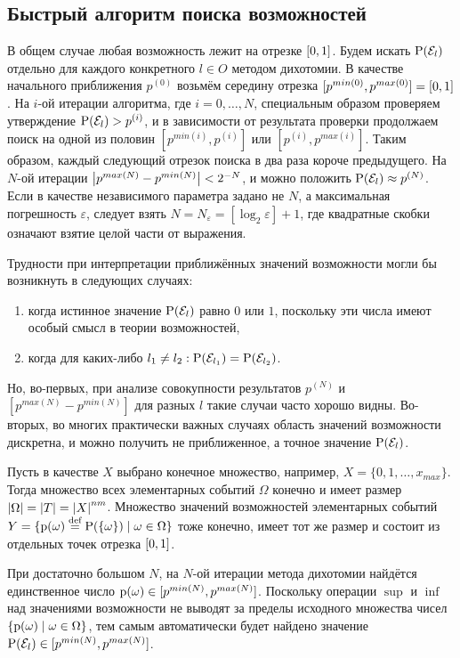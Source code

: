 \subsection{Быстрый алгоритм поиска возможностей}

В общем случае любая возможность лежит на отрезке $[0,1]$. Будем искать ${\mathrm{P}}(\mathcal{E}_l)$ отдельно для каждого конкретного $l \in O$ методом дихотомии. В качестве начального приближения $p^{(0)}$ возьмём середину отрезка $[p^{min(0)}, p^{max(0)}] = [0,1]$. На $i$-ой итерации алгоритма, где $i = 0, \ldots, N$, специальным образом проверяем утверждение ${\mathrm{P}}(\mathcal{E}_l) > p^{(i)}$, и в зависимости от результата проверки продолжаем поиск на одной из половин $[p^{min(i)}, p^{(i)}]$ или $[p^{(i)}, p^{max(i)}]$. Таким образом, каждый следующий отрезок поиска в два раза короче предыдущего.  На $N$-ой итерации $\left| p^{max(N)} - p^{min(N)} \right| < 2^{-N}$, и можно положить ${\mathrm{P}}(\mathcal{E}_l) \approx p^{(N)}$. Если в качестве независимого параметра задано не $N$, а максимальная погрешность  $\varepsilon$, следует взять $N = N_{\varepsilon} = [\log_2{\varepsilon}]+1$,  где квадратные скобки означают взятие целой части от выражения. 

Трудности при интерпретации приближённых значений возможности могли бы возникнуть в следующих случаях:
\begin{enumerate}
  \item когда истинное значение ${\mathrm{P}}(\mathcal{E}_l)$ равно $0$ или $1$, поскольку эти числа имеют особый смысл в теории возможностей,
  \item когда для каких-либо $l_1 \neq l_2: {\mathrm{P}}(\mathcal{E}_{l_1}) = {\mathrm{P}}(\mathcal{E}_{l_2})$.
\end{enumerate}

Но, во-первых, при анализе совокупности результатов $p^{(N)}$ и $[p^{max(N)} - p^{min(N)}]$ для разных $l$ такие случаи часто хорошо видны. Во-вторых, во многих практически важных случаях область значений возможности дискретна, и можно получить не приближенное, а точное значение ${\mathrm{P}}(\mathcal{E}_l)$. 

Пусть в качестве $X$ выбрано конечное множество, например, $X = \{0, 1, \ldots, x_{max}\}$. Тогда множество всех элементарных событий $\Omega$ конечно и имеет размер $\left| \Omega \right|= \left| T \right| = \left| X \right|^{nm}$. Множество значений возможностей элементарных событий $Y = \{{\mathrm{p}}(\omega) \overset{\text{def}}{=} {\mathrm{P}}(\{\omega\})\mid\omega\in\Omega\}$ тоже конечно, имеет тот же размер и состоит из отдельных точек отрезка $[0,1]$. 

При достаточно большом $N$, на $N$-ой итерации метода дихотомии найдётся единственное число ${\mathrm{p}}(\omega)\in[p^{min(N)}, p^{max(N)}]$. Поскольку операции $\sup$ и $\inf$ над значениями возможности не выводят за пределы исходного множества чисел $\{{\mathrm{p}}(\omega) \mid\omega\in\Omega\}$, тем самым автоматически будет найдено значение ${\mathrm{P}}(\mathcal{E}_l) \in [p^{min(N)}, p^{max(N)}]$.  

